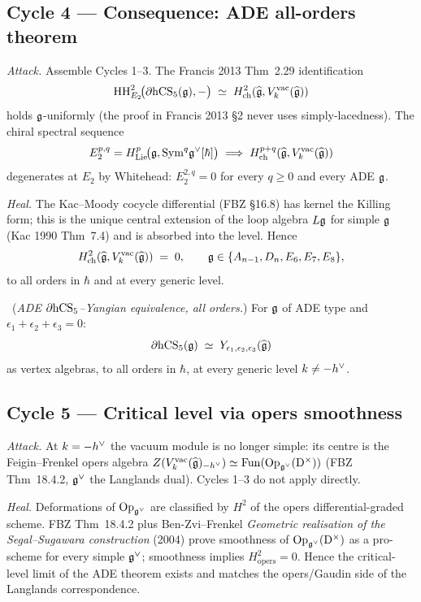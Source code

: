 \subsection{Cycle 4 --- Consequence: ADE all-orders theorem}

\emph{Attack.} Assemble Cycles 1--3. The Francis 2013 Thm~2.29
identification
\[
  \mathrm{HH}^2_{E_2}\!\bigl(\partial\mathrm{hCS}_5(\mathfrak{g}),-\bigr)
  \;\simeq\;H^2_{\mathrm{ch}}(\widehat{\mathfrak{g}},V^{\mathrm{vac}}_{k}(\widehat{\mathfrak{g}}))
\]
holds $\mathfrak{g}$-uniformly (the proof in Francis 2013 \S2 never uses
simply-lacedness). The chiral spectral sequence
\[
  E_2^{p,q}=H^p_{\mathrm{Lie}}\!\bigl(\mathfrak{g},
    \mathrm{Sym}^q\mathfrak{g}^\vee[\hbar]\bigr)\;\Longrightarrow\;
  H^{p+q}_{\mathrm{ch}}(\widehat{\mathfrak{g}},V^{\mathrm{vac}}_{k}(\widehat{\mathfrak{g}}))
\]
degenerates at $E_2$ by Whitehead: $E_2^{2,q}=0$ for every $q\ge 0$
and every ADE $\mathfrak{g}$.

\emph{Heal.} The Kac--Moody cocycle differential (FBZ \S 16.8)
has kernel the Killing form; this is the unique central extension
of the loop algebra $L\mathfrak{g}$ for simple $\mathfrak{g}$ (Kac 1990
Thm~7.4) and is absorbed into the level. Hence
\[
  H^2_{\mathrm{ch}}(\widehat{\mathfrak{g}},V^{\mathrm{vac}}_{k}(\widehat{\mathfrak{g}}))\;=\;0,\qquad
  \mathfrak{g}\in\{A_{n-1},D_n,E_6,E_7,E_8\},
\]
to all orders in $\hbar$ and at every generic level.

\ClaimStatusTheorem\ (\emph{ADE $\partial\mathrm{hCS}_5$--Yangian
equivalence, all orders.}) For $\mathfrak{g}$ of ADE type and
$\epsilon_1+\epsilon_2+\epsilon_3=0$:
\[
  \partial\mathrm{hCS}_5(\mathfrak{g})\;\simeq\;Y_{\epsilon_1,\epsilon_2,\epsilon_3}(\widehat{\mathfrak{g}})
\]
as vertex algebras, to all orders in $\hbar$, at every generic
level $k\ne-h^{\vee}$.

\subsection{Cycle 5 --- Critical level via opers smoothness}

\emph{Attack.} At $k=-h^{\vee}$ the vacuum module is no longer
simple: its centre is the Feigin--Frenkel opers algebra
$Z(V^{\mathrm{vac}}_{k}(\widehat{\mathfrak{g}})_{-h^{\vee}})\simeq\mathrm{Fun}(\mathrm{Op}_{\mathfrak{g}^\vee}
(\mathrm{D}^\times))$ (FBZ Thm~18.4.2, $\mathfrak{g}^\vee$ the Langlands
dual). Cycles 1--3 do not apply directly.

\emph{Heal.} Deformations of $\mathrm{Op}_{\mathfrak{g}^\vee}$ are
classified by $H^2$ of the opers differential-graded scheme. FBZ
Thm~18.4.2 plus Ben-Zvi--Frenkel \emph{Geometric realisation of the
Segal--Sugawara construction} (2004) prove smoothness of
$\mathrm{Op}_{\mathfrak{g}^\vee}(\mathrm{D}^\times)$ as a pro-scheme for
every simple $\mathfrak{g}^\vee$; smoothness implies
$H^2_{\mathrm{opers}}=0$. Hence the critical-level limit of the
ADE theorem exists and matches the opers/Gaudin side of the
Langlands correspondence.

